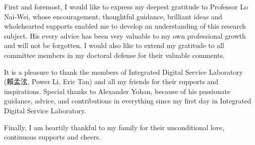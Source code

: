 First and foremost, I would like to express my deepest gratitude to Professor Lo Nai-Wei,
whose encouragement, thoughtful guidance, brilliant ideas and wholehearted supports
enabled me to develop an understanding of this research subject.
His every advice has been very valuable to my own professional growth and will not be forgotten.
I would also like to extend my gratitude to 
all committee members in my doctoral defense for their valuable comments.

It is a pleasure to thank the members of Integrated Digital Service Laboratory (賴孟泫, Power Li, Eric Tan) and all my friends for their supports and inspirations. Special thanks to Alexander Yohan, because of his passionate guidance, advice, and contributions in everything since my first day in Integrated Digital Service Laboratory.

Finally, I am heartily thankful to my family
for their unconditional love, continuous supports and cheers.